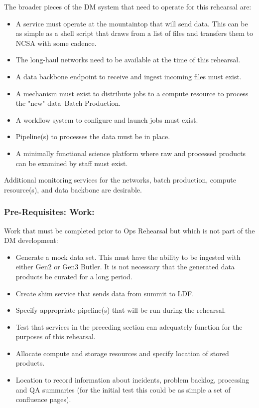 The broader pieces of the DM system that need to operate for this rehearsal are:
\begin{itemize}[topsep=-8pt]
\item A service must operate at the mountaintop that will send data.  This can 
be as simple as a shell script that draws from a list of files and transfers 
them to NCSA with some cadence. 
\item The long-haul networks need to be available at the time of this rehearsal.
\item A data backbone endpoint to receive and ingest incoming files must exist.
\item A mechanism must exist to distribute jobs to a compute resource 
to process the "new" data--Batch Production.
\item A workflow system to configure and launch jobs must exist.
\item Pipeline(s) to processes the data must be in place.
\item A minimally functional science platform where raw and processed products can be 
examined by staff must exist.
\end{itemize}

Additional monitoring services for the networks, batch production, compute 
resource(s), and data backbone are desirable.

\subsubsection{Pre-Requisites: Work:}\label{prework}

Work that must be completed prior to Ops Rehearsal but which is not part of 
the DM development:
\begin{itemize}[topsep=-8pt]
\item Generate a mock data set.  This must have the ability to be ingested with 
either Gen2 or Gen3 Butler.  It is not necessary that the generated data 
products be curated for a long period.
\item Create shim service that sends data from summit to LDF.
\item Specify appropriate pipeline(s) that will be run during the rehearsal.
\item Test that services in the preceding section can adequately function 
for the purposes of this rehearsal.
\item Allocate compute and storage resources and specify location of stored 
products.
\item Location to record information about incidents, problem backlog, 
processing and QA summaries (for the initial test this could be as simple a 
set of confluence pages).
\end{itemize}


